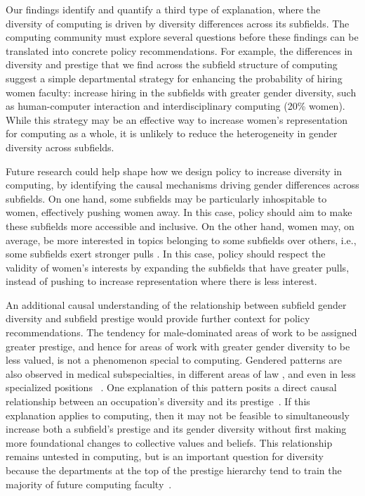 \documentclass[reprint, twocolumn, aps, nofootinbib, superscriptaddress, longbibliography]{revtex4-1}
\begin{document}
Our findings identify and quantify a third type of explanation, where the diversity of computing is driven by diversity differences across its subfields. The computing community must explore several questions before these findings can be translated into concrete policy recommendations. For example, the differences in diversity and prestige that we find across the subfield structure of computing suggest a simple departmental strategy for enhancing the probability of hiring women faculty: increase hiring in the subfields with greater gender diversity, such as human-computer interaction and interdisciplinary computing (20\% women). While this strategy may be an effective way to increase women's representation for computing as a whole, it is unlikely to reduce the heterogeneity in gender diversity across subfields. 

Future research could help shape how we design policy to increase diversity in computing, by identifying the causal mechanisms driving gender differences across subfields. On one hand, some subfields may be particularly inhospitable to women, effectively pushing women away. In this case, policy should aim to make these subfields more accessible and inclusive. On the other hand, women may, on average, be more interested in topics belonging to some subfields over others, i.e., some subfields exert stronger pulls \cite{kozlowski2022intersectional}. In this case, policy should respect the validity of women's interests by expanding the subfields that have greater pulls, instead of pushing to increase representation where there is less interest. 

An additional causal understanding of the relationship between subfield gender diversity and subfield prestige would provide further context for policy recommendations. The tendency for male-dominated areas of work to be assigned greater prestige, and hence for areas of work with greater gender diversity to be less valued, is not a phenomenon special to computing. Gendered patterns are also observed in medical subspecialties, in different areas of law \cite{buerba2020role, dixon1995stratification}, and even in less specialized positions ~\cite{blum1991between, tam1997sex}. One explanation of this pattern posits a direct causal relationship between an occupation's diversity and its prestige~\cite{england2017comparable}. If this explanation applies to computing, then it may not be feasible to simultaneously increase both a subfield's prestige and its gender diversity without first making more foundational changes to collective values and beliefs. This relationship remains untested in computing, but is an important question for diversity because the departments at the top of the prestige hierarchy tend to train the majority of future computing faculty~\cite{clauset2015systematic}. 
\end{document}
